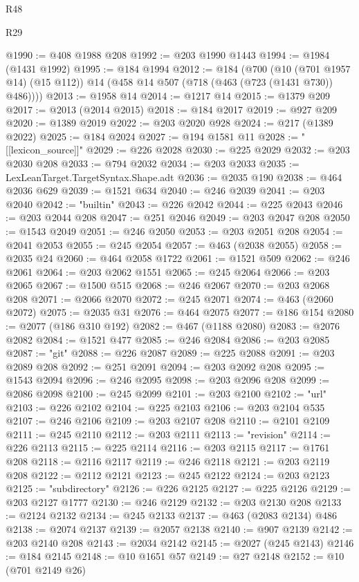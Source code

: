 \begin{lexlean}{R48}
\begin{lexlean}{R29}
\begin{coremodule}
{{{{{{{{{{{{{{{{{{{{{{{{{{{{{{{{{{{{{{{{{{{{{{{{{{{{{{{{{{{{{{{{{{{{{{{{{{{{{{{{{{{{{{{{{{{{{{{{{{{{{{{{{{{{{{{{{{{{{{{{{{{{{{{{{{{{{{{{{{{{{{{{{{{{{{{{{{{{{{{{{{{{{{{{{{{{{{{{{{{{{{{{{{{{{{{{{{{{{{{{{{{{{{{{{{{{{{{{{{@1990 := @408 @1988 @208
@1992 := @203 @1990 @1443
@1994 := @1984 (@1431 @1992)
@1995 := @184 @1994
@2012 := @184
    (@700
      (@10 (@701 @1957 @14) (@15 @112))
      @14
      (@458 @14 @507 (@718 (@463 (@723 (@1431 @730)) @486))))
@2013 := @1958 @14
@2014 := @1217 @14
@2015 := @1379 @209
@2017 := @2013 (@2014 @2015)
@2018 := @184 @2017
@2019 := @927 @209
@2020 := @1389 @2019
@2022 := @203 @2020 @928
@2024 := @217 (@1389 @2022)
@2025 := @184 @2024
@2027 := @194 @1581 @11
@2028 := "[[lexicon_source]]"
@2029 := @226 @2028
@2030 := @225 @2029
@2032 := @203 @2030 @208
@2033 := @794 @2032
@2034 := @203 @2033
@2035 := LexLeanTarget.TargetSyntax.Shape.adt
@2036 := @2035 @190
@2038 := @464 @2036 @629
@2039 := @1521 @634
@2040 := @246 @2039
@2041 := @203 @2040
@2042 := "builtin"
@2043 := @226 @2042
@2044 := @225 @2043
@2046 := @203 @2044 @208
@2047 := @251 @2046
@2049 := @203 @2047 @208
@2050 := @1543 @2049
@2051 := @246 @2050
@2053 := @203 @2051 @208
@2054 := @2041 @2053
@2055 := @245 @2054
@2057 := @463 (@2038 @2055)
@2058 := @2035 @24
@2060 := @464 @2058 @1722
@2061 := @1521 @509
@2062 := @246 @2061
@2064 := @203 @2062 @1551
@2065 := @245 @2064
@2066 := @203 @2065
@2067 := @1500 @515
@2068 := @246 @2067
@2070 := @203 @2068 @208
@2071 := @2066 @2070
@2072 := @245 @2071
@2074 := @463 (@2060 @2072)
@2075 := @2035 @31
@2076 := @464 @2075
@2077 := @186 @154
@2080 := @2077 (@186 @310 @192)
@2082 := @467 (@1188 @2080)
@2083 := @2076 @2082
@2084 := @1521 @477
@2085 := @246 @2084
@2086 := @203 @2085
@2087 := "git"
@2088 := @226 @2087
@2089 := @225 @2088
@2091 := @203 @2089 @208
@2092 := @251 @2091
@2094 := @203 @2092 @208
@2095 := @1543 @2094
@2096 := @246 @2095
@2098 := @203 @2096 @208
@2099 := @2086 @2098
@2100 := @245 @2099
@2101 := @203 @2100
@2102 := "url"
@2103 := @226 @2102
@2104 := @225 @2103
@2106 := @203 @2104 @535
@2107 := @246 @2106
@2109 := @203 @2107 @208
@2110 := @2101 @2109
@2111 := @245 @2110
@2112 := @203 @2111
@2113 := "revision"
@2114 := @226 @2113
@2115 := @225 @2114
@2116 := @203 @2115
@2117 := @1761 @208
@2118 := @2116 @2117
@2119 := @246 @2118
@2121 := @203 @2119 @208
@2122 := @2112 @2121
@2123 := @245 @2122
@2124 := @203 @2123
@2125 := "subdirectory"
@2126 := @226 @2125
@2127 := @225 @2126
@2129 := @203 @2127 @1777
@2130 := @246 @2129
@2132 := @203 @2130 @208
@2133 := @2124 @2132
@2134 := @245 @2133
@2137 := @463 (@2083 @2134) @486
@2138 := @2074 @2137
@2139 := @2057 @2138
@2140 := @907 @2139
@2142 := @203 @2140 @208
@2143 := @2034 @2142
@2145 := @2027 (@245 @2143)
@2146 := @184 @2145
@2148 := @10 @1651 @57
@2149 := @27 @2148
@2152 := @10 (@701 @2149 @26)
}}}}}}}}}}}}}}}}}}}}}}}}}}}}}}}}}}}}}}}}}}}}}}}}}}}}}}}}}}}}}}}}}}}}}}}}}}}}}}}}}}}}}}}}}}}}}}}}}}}}}}}}}}}}}}}}}}}}}}}}}}}}}}}}}}}}}}}}}}}}}}}}}}}}}}}}}}}}}}}}}}}}}}}}}}}}}}}}}}}}}}}}}}}}}}}}}}}}}}}}}}}}}}}}}}}}}}}}}}
\end{coremodule}
\end{lexlean}
\end{lexlean}
